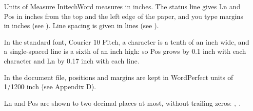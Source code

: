 \begin{Feature}{Units of Measure}
InitechWord measures in inches.  The status line gives Ln and Pos in inches
from the top and the left edge of the paper, and you type margins in inches
(see ).  Line spacing is given in lines (see
).

\Notes
{}
In the standard font, Courier 10 Pitch, a character is a tenth of an inch
wide, and a single-spaced line is a sixth of an inch high: so Pos grows by
0.1 inch with each character and Ln by 0.17 inch with each line.

In the document file, positions and margins are kept in WordPerfect units of
1/1200 inch (see Appendix D).

Ln and Pos are shown to two decimal places at most, without trailing zeros:
, .

\end{Feature}
